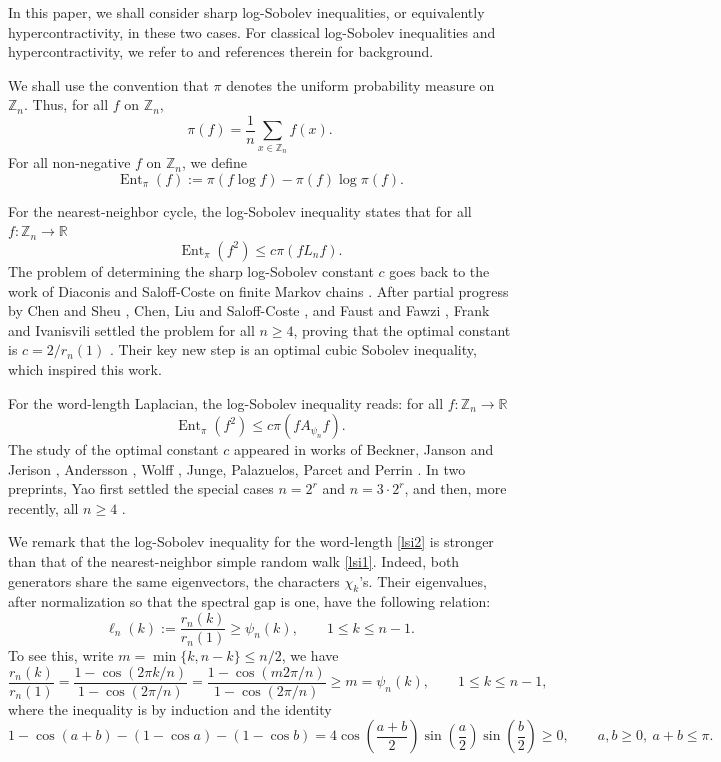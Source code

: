 \documentclass[11pt]{amsart}
\numberwithin{equation}{section}
\theoremstyle{plain}
\theoremstyle{remark}
\newcommand{\RR}{\mathbb R}
\newcommand{\Zn}[1]{\mathbb Z_{#1}}
\newcommand{\psin}{\psi_n}
\newcommand{\Apsi}{A_{\psin}}
\newcommand{\AvgSymbol}{\pi}
\newcommand{\Avg}[1]{\AvgSymbol\!\left(#1\right)}
\newcommand{\EntMeasure}{\pi}
\newcommand{\Ent}[1]{\operatorname{Ent}_{\EntMeasure}\!\left(#1\right)}
\begin{document}
In this paper, we shall consider sharp log-Sobolev inequalities, or equivalently hypercontractivity, in these two cases. For classical log-Sobolev inequalities and hypercontractivity, we refer to
\cite{Bonami1970,Gross1975,Beckner1975,Gross2006} and references therein for background.

We shall use the convention that \(\pi\) denotes the uniform probability measure
on \(\Zn{n}\).  Thus, for all $f$ on $\Zn{n}$,
\[
\Avg{f}
=
\frac1n\sum_{x\in\mathbb Z_n}f(x).
\]
For all non-negative $f$ on $\Zn{n}$, we define
\[
\Ent{f}
:=
\Avg{f\log f}
-
\Avg{f}
\log \Avg{f}.
\]


For the nearest-neighbor cycle, the log-Sobolev inequality states that for all $f:\Zn{n}\to \RR$
\begin{equation}\label{lsi1}
    \Ent{f^2}\le c\Avg{f L_n f}.
\end{equation}
The problem of determining the sharp
log-Sobolev constant $c$ goes back to the work of Diaconis and Saloff-Coste on
finite Markov chains \cite{DiaconisSaloffCoste1996}.
After partial progress by Chen and Sheu \cite{ChenSheu2003}, Chen, Liu and
Saloff-Coste \cite{ChenLiuSaloffCoste2008}, and Faust and Fawzi
\cite{FaustFawzi2024}, Frank and Ivanisvili settled the problem for all
\(n\ge4\), proving
that the optimal constant is \(c=2/r_n(1)\)
\cite{FrankIvanisvili2026}. Their key new step is an optimal cubic Sobolev
inequality, which inspired this work.

For the word-length Laplacian, the log-Sobolev inequality reads: for all $f:\Zn{n}\to \RR$
\begin{equation}\label{lsi2}
    \Ent{f^2}\le c\Avg{f \Apsi f}.
\end{equation}
The study of the optimal constant $c$ appeared in works of Beckner, Janson and Jerison \cite{BJJ1983}, Andersson \cite{Andersson2002}, Wolff \cite{Wolff2007},
Junge, Palazuelos, Parcet and Perrin \cite{JPPP2017}.
In two preprints, Yao first \cite{Yao2025} settled the special cases \(n=2^r\) and
\(n=3\cdot2^r\), and then, more recently, all \(n\ge4\) \cite{Yao2026}. 

We remark that the log-Sobolev inequality for the word-length \eqref{lsi2} is stronger than that of the nearest-neighbor simple random walk \eqref{lsi1}.
Indeed, both generators share the same eigenvectors, the characters $\chi_k$'s.
Their eigenvalues, after normalization so that the spectral gap is one, have the following relation:
\begin{equation}\label{eq:eigenvalue comparison}
    \ell_n(k):=\frac{r_n(k)}{r_n(1)}\ge \psi_n(k),\qquad 1\le k\le n-1.
\end{equation}
To see this, write $m=\min\{k,n-k\}\le n/2$, we have
\begin{equation}
    \frac{r_n(k)}{r_n(1)}=\frac{1-\cos(2\pi k/n)}{1-\cos(2\pi/n)}
=\frac{1-\cos(m 2\pi/n)}{1-\cos (2\pi/n)}
\ge m=
\psi_n(k),\qquad 1\le k\le n-1,
\end{equation}
 where the inequality is by induction and the identity
 \[
1-\cos(a+b)-(1-\cos a)-(1-\cos b)
=
4\cos\!\left(\frac{a+b}{2}\right)
\sin\!\left(\frac{a}{2}\right)
\sin\!\left(\frac{b}{2}\right)
\ge 0,
\qquad a,b\ge 0,\ a+b\le \pi.
\]
\end{document}
